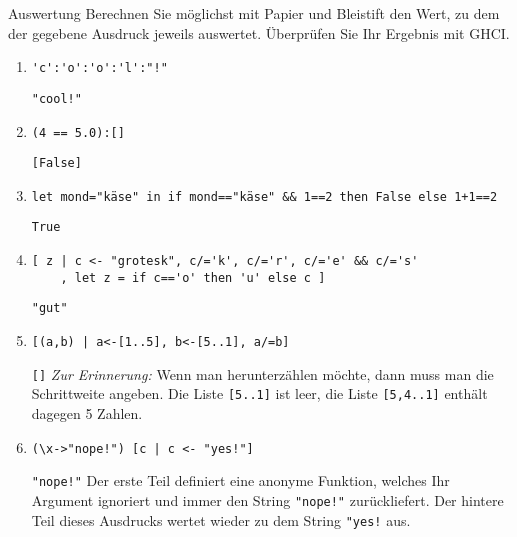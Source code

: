 \documentclass[11pt]{article}
\begin{document}
\begin{aufgabe}{Auswertung}\label{Auswerten}%
Berechnen Sie möglichst mit Papier und Bleistift den Wert,
zu dem der gegebene Ausdruck
jeweils auswertet. Überprüfen Sie Ihr Ergebnis mit GHCI.

\begin{enumerate}
  \item \verb|'c':'o':'o':'l':"!"|
      \begin{loesung}
        \verb|"cool!"|
      \end{loesung}
  \item \verb|(4 == 5.0):[]|
      \begin{loesung}
        \verb|[False]|
      \end{loesung}
  \item \verb#let mond="käse" in if mond=="käse" && 1==2 then False else 1+1==2#
      \begin{loesung}
        \verb|True|
      \end{loesung}
  \item \begin{verbatim}
[ z | c <- "grotesk", c/='k', c/='r', c/='e' && c/='s'
    , let z = if c=='o' then 'u' else c ]\end{verbatim}
      \begin{loesung}
        \verb|"gut"|
      \end{loesung}
  \item \verb![(a,b) | a<-[1..5], b<-[5..1], a/=b]!
      \begin{loesung}
        \verb|[]|
       \emph{Zur Erinnerung:} Wenn man herunterzählen möchte, dann muss man die Schrittweite angeben.
       Die Liste \verb|[5..1]| ist leer, die Liste \verb|[5,4..1]| enthält dagegen 5 Zahlen.
      \end{loesung}
  \item \verb#(\x->"nope!") [c | c <- "yes!"]#
      \begin{loesung}
        \verb|"nope!"|
        Der erste Teil definiert eine anonyme Funktion, welches Ihr Argument ignoriert und immer den String \verb|"nope!"| zurückliefert.
        Der hintere Teil dieses Ausdrucks wertet wieder zu dem String \verb|"yes!| aus.
      \end{loesung}
\end{enumerate}
\end{aufgabe}
\end{document}
